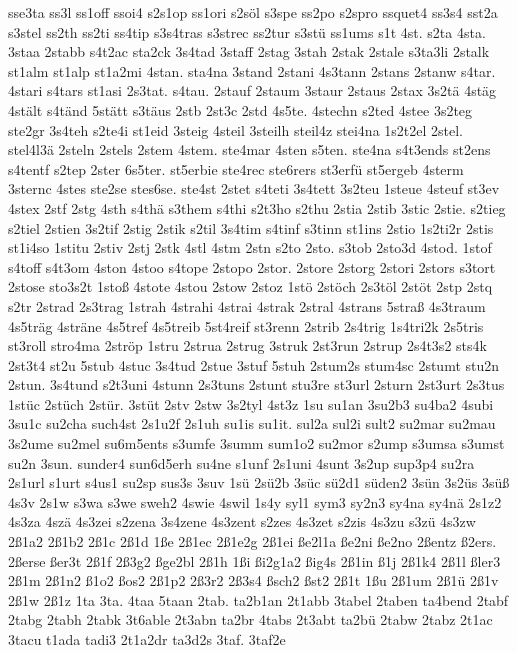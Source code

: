 {sse3ta
ss3l
ss1off
ssoi4
s2s1op
ss1ori
s2söl
s3spe
ss2po
s2spro
ssquet4
ss3s4
sst2a
s3stel
ss2th
ss2ti
ss4tip
s3s4tras
s3strec
ss2tur
s3stü
ss1ums
s1t
4st.
s2ta
4sta.
3staa
2stabb
s4t2ac
sta2ck
3s4tad
3staff
2stag
3stah
2stak
2stale
s3ta3li
2stalk
st1alm
st1alp
st1a2mi
4stan.
sta4na
3stand
2stani
4s3tann
2stans
2stanw
s4tar.
4stari
s4tars
st1asi
2s3tat.
s4tau.
2stauf
2staum
3staur
2staus
2stax
3s2tä
4stäg
4stält
s4tänd
5stätt
s3täus
2stb
2st3c
2std
4s5te.
4stechn
s2ted
4stee
3s2teg
ste2gr
3s4teh
s2te4i
st1eid
3steig
4steil
3steilh
steil4z
stei4na
1s2t2el
2stel.
stel4l3ä
2steln
2stels
2stem
4stem.
ste4mar
4sten
s5ten.
ste4na
s4t3ends
st2ens
s4tentf
s2tep
2ster
6s5ter.
st5erbie
ste4rec
ste6rers
st3erfü
st5ergeb
4sterm
3sternc
4stes
ste2se
stes6se.
ste4st
2stet
s4teti
3s4tett
3s2teu
1steue
4steuf
st3ev
4stex
2stf
2stg
4sth
s4thä
s3them
s4thi
s2t3ho
s2thu
2stia
2stib
3stic
2stie.
s2tieg
s2tiel
2stien
3s2tif
2stig
2stik
s2til
3s4tim
s4tinf
s3tinn
st1ins
2stio
1s2ti2r
2stis
st1i4so
1stitu
2stiv
2stj
2stk
4stl
4stm
2stn
s2to
2sto.
s3tob
2sto3d
4stod.
1stof
s4toff
s4t3om
4ston
4stoo
s4tope
2stopo
2stor.
2store
2storg
2stori
2stors
s3tort
2stose
sto3s2t
1stoß
4stote
4stou
2stow
2stoz
1stö
2stöch
2s3töl
2stöt
2stp
2stq
s2tr
2strad
2s3trag
1strah
4strahi
4strai
4strak
2stral
4strans
5straß
4s3traum
4s5träg
4sträne
4s5tref
4s5treib
5st4reif
st3renn
2strib
2s4trig
1s4tri2k
2s5tris
st3roll
stro4ma
2ströp
1stru
2strua
2strug
3struk
2st3run
2strup
2s4t3s2
sts4k
2st3t4
st2u
5stub
4stuc
3s4tud
2stue
3stuf
5stuh
2stum2s
stum4sc
2stumt
stu2n
2stun.
3s4tund
s2t3uni
4stunn
2s3tuns
2stunt
stu3re
st3url
2sturn
2st3urt
2s3tus
1stüc
2stüch
2stür.
3stüt
2stv
2stw
3s2tyl
4st3z
1su
su1an
3su2b3
su4ba2
4subi
3su1c
su2cha
such4st
2s1u2f
2s1uh
su1is
su1it.
sul2a
sul2i
sult2
su2mar
su2mau
3s2ume
su2mel
su6m5ents
s3umfe
3summ
sum1o2
su2mor
s2ump
s3umsa
s3umst
su2n
3sun.
sunder4
sun6d5erh
su4ne
s1unf
2s1uni
4sunt
3s2up
sup3p4
su2ra
2s1url
s1urt
s4us1
su2sp
sus3s
3suv
1sü
2sü2b
3süc
sü2d1
süden2
3sün
3s2üs
3süß
4s3v
2s1w
s3wa
s3we
sweh2
4swie
4swil
1s4y
syl1
sym3
sy2n3
sy4na
sy4nä
2s1z2
4s3za
4szä
4s3zei
s2zena
3s4zene
4s3zent
s2zes
4s3zet
s2zis
4s3zu
s3zü
4s3zw
2ß1a2
2ß1b2
2ß1c
2ß1d
1ße
2ß1ec
2ß1e2g
2ß1ei
ße2l1a
ße2ni
ße2no
2ßentz
ß2ers.
2ßerse
ßer3t
2ß1f
2ß3g2
ßge2bl
2ß1h
1ßi
ßi2g1a2
ßig4s
2ß1in
ß1j
2ß1k4
2ß1l
ßler3
2ß1m
2ß1n2
ß1o2
ßos2
2ß1p2
2ß3r2
2ß3s4
ßsch2
ßst2
2ß1t
1ßu
2ß1um
2ß1ü
2ß1v
2ß1w
2ß1z
1ta
3ta.
4taa
5taan
2tab.
ta2b1an
2t1abb
3tabel
2taben
ta4bend
2tabf
2tabg
2tabh
2tabk
3t6able
2t3abn
ta2br
4tabs
2t3abt
ta2bü
2tabw
2tabz
2t1ac
3tacu
t1ada
tadi3
2t1a2dr
ta3d2s
3taf.
3taf2e
}
